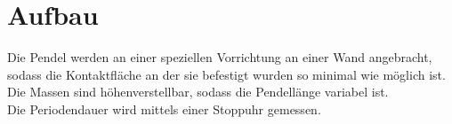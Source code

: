 \section{Aufbau}
\label{sec:aufbau}

Die Pendel werden an einer speziellen Vorrichtung an einer Wand angebracht, sodass die Kontaktfläche an der sie befestigt wurden so minimal wie möglich ist.\\
Die Massen sind höhenverstellbar, sodass die Pendellänge variabel ist.\\
Die Periodendauer wird mittels einer Stoppuhr gemessen.